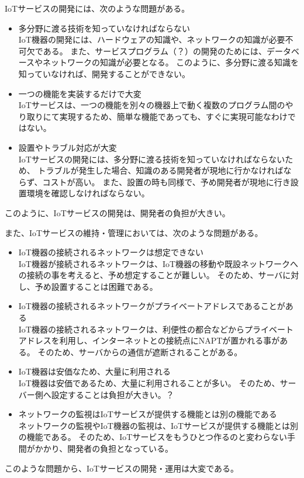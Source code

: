 IoTサービスの開発には、次のような問題がある。
\begin{itemize}
\item 多分野に渡る技術を知っていなければならない\\
	IoT機器の開発には、ハードウェアの知識や、ネットワークの知識が必要不可欠である。
	また、サービスプログラム（？）の開発のためには、データベースやネットワークの知識が必要となる。
	このように、多分野に渡る知識を知っていなければ、開発することができない。
\item 一つの機能を実装するだけで大変\\
	IoTサービスは、一つの機能を別々の機器上で動く複数のプログラム間のやり取りにて実現するため、簡単な機能であっても、すぐに実現可能なわけではない。
\item 設置やトラブル対応が大変\\
	IoTサービスの開発には、多分野に渡る技術を知っていなければならないため、
	トラブルが発生した場合、知識のある開発者が現地に行かなければならず、コストが高い。
	また、設置の時も同様で、予め開発者が現地に行き設置環境を確認しなければならない。
\end{itemize}
このように、IoTサービスの開発は、開発者の負担が大きい。

また、IoTサービスの維持・管理においては、次のような問題がある。
\begin{itemize}
\item IoT機器の接続されるネットワークは想定できない\\
	IoT機器が接続されるネットワークは、IoT機器の移動や既設ネットワークへの接続の事を考えると、予め想定することが難しい。
	そのため、サーバに対し、予め設置することは困難である。
\item IoT機器の接続されるネットワークがプライベートアドレスであることがある\\
	IoT機器の接続されるネットワークは、利便性の都合などからプライベートアドレスを利用し、インターネットとの接続点にNAPTが置かれる事がある。
	そのため、サーバからの通信が遮断されることがある。
\item IoT機器は安価なため、大量に利用される\\
	IoT機器は安価であるため、大量に利用されることが多い。
	そのため、サーバー側へ設定することは負担が大きい。？
\item ネットワークの監視はIoTサービスが提供する機能とは別の機能である\\
	ネットワークの監視やIoT機器の監視は、IoTサービスが提供する機能とは別の機能である。
	そのため、IoTサービスをもうひとつ作るのと変わらない手間がかかり、開発者の負担となっている。
\end{itemize}
このような問題から、IoTサービスの開発・運用は大変である。


